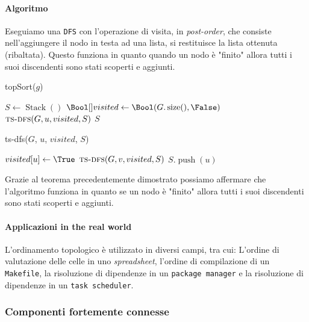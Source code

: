             \paragraph{Algoritmo} Eseguiamo una \texttt{DFS} con l'operazione di visita, in \textit{post-order}, che consiste nell'aggiungere il nodo in testa ad una lista, si restituisce la lista ottenuta (ribaltata).\newline
            Questo funziona in quanto quando un nodo è "finito" allora tutti i suoi discendenti sono stati scoperti e aggiunti.
            \begin{algorithm}[H]
                \caption{\Stack topSort(\Graph $g$)}
                \begin{algorithmic}
                    \State \Stack $S \gets \operatorname{Stack}()$
                    \State $\Bool[] visited \gets \Bool(G.\operatorname{size}(),\False)$
                            \State $\Call{ts-dfs}{G,u,visited,S}$
                        \EndIf
                    \EndFor
                    \State \Return $S$
                \end{algorithmic}
            \end{algorithm}
            \begin{algorithm}[H]
                \caption{ts-dfs(\Graph $G$, \Node $u$, \Bool[] $visited$, \Stack $S$)}
                \begin{algorithmic}
                    \State $visited[u] \gets \True$
                            \State $\Call{ts-dfs}{G,v,visited,S}$
                        \EndIf
                    \EndFor
                    \State $S.\operatorname{push}(u)$
                \end{algorithmic}
            \end{algorithm}

            Grazie al teorema precedentemente dimostrato possiamo affermare che l'algoritmo funziona in quanto se un nodo è "finito" allora tutti i suoi discendenti sono stati scoperti e aggiunti.
            \paragraph{Applicazioni in the real world} L'ordinamento topologico è utilizzato in diversi campi, tra cui: L'ordine di valutazione delle celle in uno \textit{spreadsheet}, l'ordine di compilazione di un \texttt{Makefile}, la risoluzione di dipendenze in un \texttt{package manager} e la risoluzione di dipendenze in un \texttt{task scheduler}.
        \subsubsection{Componenti fortemente connesse}
